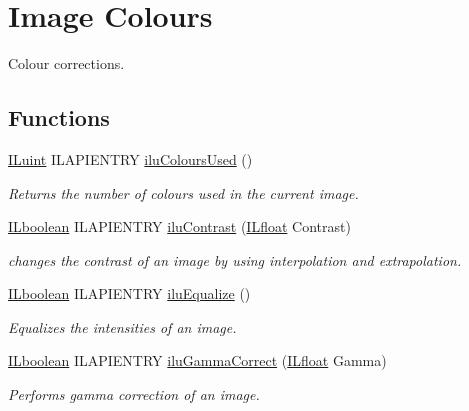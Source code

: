 \hypertarget{group__ilu__colour}{\section{Image Colours}
\label{group__ilu__colour}
}


Colour corrections.  


\subsection*{Functions}
\begin{DoxyCompactItemize}
\item 
\hyperlink{group__il__types_gaff8e86a1072c8d7cfe387fb87c6ed8e1}{I\+Luint} I\+L\+A\+P\+I\+E\+N\+T\+R\+Y \hyperlink{group__ilu__colour_ga1c019783a7ab60a1b9fee1ed5b2aadbe}{ilu\+Colours\+Used} ()
\begin{DoxyCompactList}\small\item\em Returns the number of colours used in the current image. \end{DoxyCompactList}\item 
\hyperlink{group__il__types_gaa6aa7c95cfdc06b4d8601ef832b7bb0a}{I\+Lboolean} I\+L\+A\+P\+I\+E\+N\+T\+R\+Y \hyperlink{group__ilu__colour_ga674c6a79168815f579338c30e94cd086}{ilu\+Contrast} (\hyperlink{group__il__types_ga376156c9461893f4b1a5de9579dc86f2}{I\+Lfloat} Contrast)
\begin{DoxyCompactList}\small\item\em changes the contrast of an image by using interpolation and extrapolation. \end{DoxyCompactList}\item 
\hyperlink{group__il__types_gaa6aa7c95cfdc06b4d8601ef832b7bb0a}{I\+Lboolean} I\+L\+A\+P\+I\+E\+N\+T\+R\+Y \hyperlink{group__ilu__colour_ga5543086bca10106a064d3dce59770312}{ilu\+Equalize} ()
\begin{DoxyCompactList}\small\item\em Equalizes the intensities of an image. \end{DoxyCompactList}\item 
\hyperlink{group__il__types_gaa6aa7c95cfdc06b4d8601ef832b7bb0a}{I\+Lboolean} I\+L\+A\+P\+I\+E\+N\+T\+R\+Y \hyperlink{group__ilu__colour_ga06739004ee4930a65ebf57354060095a}{ilu\+Gamma\+Correct} (\hyperlink{group__il__types_ga376156c9461893f4b1a5de9579dc86f2}{I\+Lfloat} Gamma)
\begin{DoxyCompactList}\small\item\em Performs gamma correction of an image. \end{DoxyCompactList}\item 

\end{DoxyCompactItemize}
